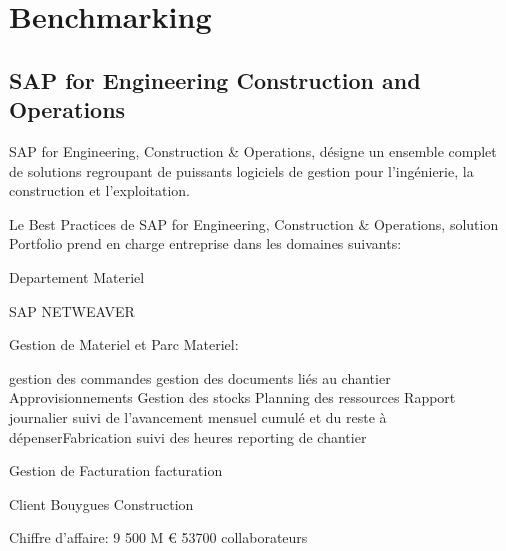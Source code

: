 \section{Benchmarking}
\subsection{SAP for Engineering Construction and Operations}
SAP for Engineering, Construction & Operations, désigne un ensemble complet de solutions regroupant de puissants logiciels de gestion pour l’ingénierie, la construction et l’exploitation.

Le Best Practices de SAP for Engineering, Construction & Operations, solution Portfolio prend en charge entreprise dans les domaines suivants:

{Departement Materiel}

SAP NETWEAVER

Gestion de Materiel et Parc Materiel: 

	gestion des commandes
	gestion des documents liés au chantier
	Approvisionnements
	Gestion des stocks
	Planning des ressources
	Rapport journalier 
	suivi de l’avancement mensuel cumulé et du reste à dépenserFabrication
	suivi des heures
	reporting de chantier
	 
Gestion de Facturation
	facturation

Client Bouygues Construction

Chiffre d'affaire: 9 500 M €
53700 collaborateurs

